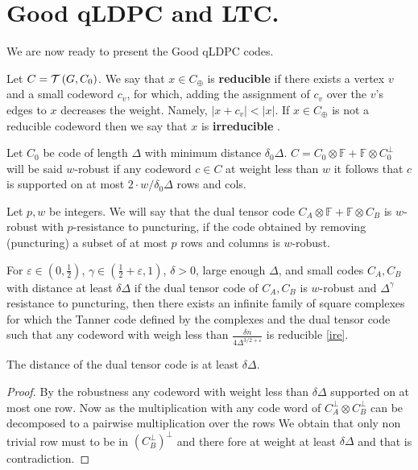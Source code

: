 \chapter{Good qLDPC and LTC.}
We are now ready to present the Good qLDPC codes. 
  \begin{definition} Let $C = \mathcal{T}\left( G, C_0 \right)$. We say that $x \in C_{\oplus}$ is \textbf{reducible} if there exists a vertex $v$ and a small codeword $c_v$, for which, adding the assignment of $c_v$ over the $v$'s edges to $x$ decreases the weight. Namely, $|x + c_{v}| < |x|$. If $x \in C_{\oplus}$ is not a reducible codeword then we say that $x$ is \textbf{irreducible} \label{ire}. \end{definition}


\begin{definition}[$w$-Robustness] Let $C_{0}$ be code of length $\Delta$ with minimum distance $\delta_{0}\Delta$. $C = C_{0} \otimes \mathbb{F} + \mathbb{F}\otimes C_{0}^{\perp}$ will be said $w$-robust if any codeword $c \in C$ at weight less than $w$ it follows that $c$ is supported on at most $2\cdot w/\delta_{0}\Delta$ rows and cols.
\end{definition}

\begin{definition} Let $p,w$ be integers. We will say that the dual tensor code $C_{A} \otimes \mathbb{F} + \mathbb{F} \otimes C_{B}$ is $w$-robust with $p$-resistance to puncturing, if the code obtained by removing (puncturing) a subset of at most $p$ rows and columns is $w$-robust.   
\end{definition}

\begin{theorem}
  For $\varepsilon \in \left( 0,\frac{1}{2} \right)$, $\gamma\in \left( \frac{1}{2} + \varepsilon, 1 \right)$, $\delta> 0$, large enough $\Delta$, and small codes $C_{A},C_{B}$ with distance at least $\delta\Delta$ if the dual tensor code of $C_{A},C_{B}$ is $w$-robust and $\Delta^{\gamma}$ resistance to puncturing, then there exists an infinite family of square complexes for which the Tanner code defined by the complexes and the dual tensor code such that any codeword with weigh less than $ \frac{\delta n}{4\Delta^{3/2 + \varepsilon}} $ is reducible \cref{ire}.
\end{theorem}

\begin{claim}
  The distance of the dual tensor code is at least $\delta\Delta$.
\end{claim}
\begin{proof}
  By the robustness any codeword with weight less than $\delta\Delta$ supported on at most one row. Now as the multiplication with any code word of $C_{A}^\perp \otimes C_{B}^\perp$ can be decomposed to a pairwise multiplication over the rows We obtain that only non trivial row must to be in $ \left( C_{B}^{\perp} \right)^{\perp}$ and there fore at weight at least $\delta\Delta$ and that is contradiction.  
\end{proof}

